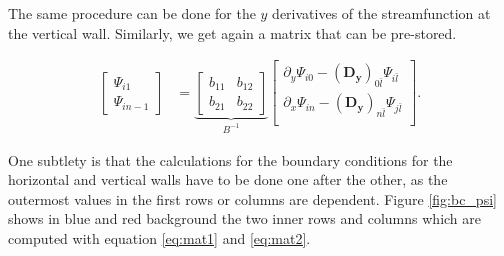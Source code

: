 The same procedure can be done for the $y$ derivatives of the streamfunction at
the vertical wall. Similarly, we get again a matrix that can be pre-stored. 

\begin{align}
\begin{bmatrix} \Psi_{i1} \\ \Psi_{in-1}
\end{bmatrix} &=
\underbrace{\begin{bmatrix} b_{11} & b_{12} \\ b_{21} & b_{22} 
\end{bmatrix}}_{B^{-1}}
\begin{bmatrix}
\partial_y\Psi_{i0} - (\mathbf{D_y})_{0\bar{l}}\Psi_{i\bar{l}} \\
\partial_x\Psi_{in} - (\mathbf{D_y})_{n\bar{l}}\Psi_{j\bar{l}} \\
\end{bmatrix}.
\label{eq:mat2}
\end{align}

One subtlety is that the calculations for the boundary conditions for the
horizontal and vertical walls have to be done one after the other, as the
outermost values in the first rows or columns are dependent. Figure
\ref{fig:bc_psi} shows in blue and red background the two inner rows and
columns which are computed with equation \eqref{eq:mat1} and \eqref{eq:mat2}.

